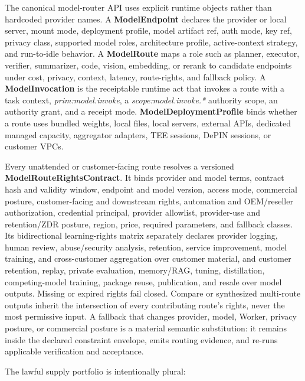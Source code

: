 \documentclass[
  11pt,
]{article}
\begin{document}
The canonical model-router API uses explicit runtime objects rather than
hardcoded provider names. A \textbf{ModelEndpoint} declares the provider
or local server, mount mode, deployment profile, model artifact ref,
auth mode, key ref, privacy class, supported model roles, architecture
profile, active-context strategy, and run-to-idle behavior. A
\textbf{ModelRoute} maps a role such as planner, executor, verifier,
summarizer, code, vision, embedding, or rerank to candidate endpoints
under cost, privacy, context, latency, route-rights, and fallback policy. A
\textbf{ModelInvocation} is the receiptable runtime act that invokes a
route with a task context, \emph{prim:model.invoke}, a
\emph{scope:model.invoke.*} authority scope, an authority grant, and a
receipt mode. \textbf{ModelDeploymentProfile} binds whether a route uses
bundled weights, local files, local servers, external APIs, dedicated
managed capacity, aggregator adapters, TEE sessions, DePIN sessions, or
customer VPCs.

Every unattended or customer-facing route resolves a versioned
\textbf{ModelRouteRightsContract}. It binds provider and model terms,
contract hash and validity window, endpoint and model version, access
mode, commercial posture, customer-facing and downstream rights,
automation and OEM/reseller authorization, credential principal,
provider allowlist, provider-use and retention/ZDR posture, region, price, required
parameters, and fallback classes. Its bidirectional learning-rights matrix
separately declares provider logging, human review, abuse/security analysis,
retention, service improvement, model training, and cross-customer aggregation
over customer material, and customer retention, replay, private evaluation,
memory/RAG, tuning, distillation, competing-model training, package reuse,
publication, and resale over model outputs. Missing or expired rights fail
closed. Compare or synthesized multi-route outputs inherit the intersection of
every contributing route's rights, never the most permissive input. A fallback that changes provider, model,
Worker, privacy posture, or commercial posture is a material semantic
substitution: it remains inside the declared constraint envelope, emits
routing evidence, and re-runs applicable verification and acceptance.

The lawful supply portfolio is intentionally plural:
\end{document}
